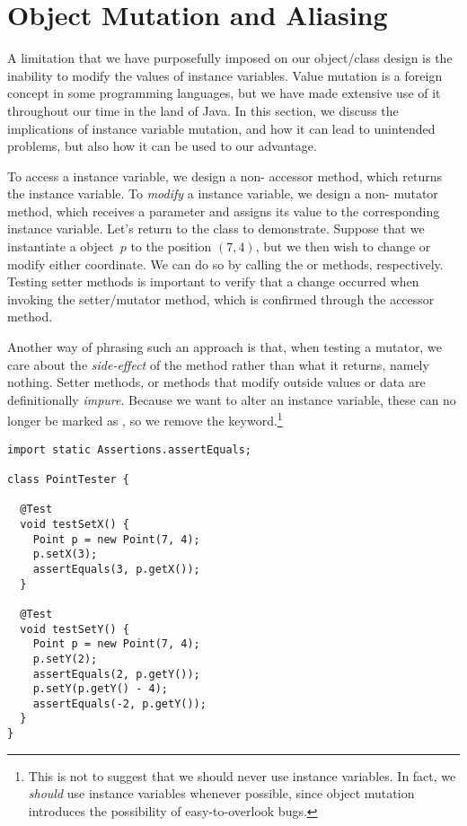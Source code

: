 \section{Object Mutation and Aliasing}
\label{chapter-classes-mutation-aliasing}

A limitation that we have purposefully imposed on our object/class design is the inability to modify the values of instance variables. 
Value mutation is a foreign concept in some programming languages, but we have made extensive use of it throughout our time in the land of Java. 
In this section, we discuss the implications of instance variable mutation, and how it can lead to unintended problems, but also how it can be used to our advantage.

To access a  instance variable, we design a non- accessor method, which returns the instance variable. 
To \emph{modify} a  instance variable, we design a non- mutator method, which receives a parameter and assigns its value to the corresponding instance variable. 
Let's return to the  class to demonstrate. 
Suppose that we instantiate a  object~$p$ to the position $(7, 4)$, but we then wish to change or modify either coordinate. 
We can do so by calling the  or  methods, respectively. 
Testing setter methods is important to verify that a change occurred when invoking the setter/mutator method, which is confirmed through the accessor method. 

Another way of phrasing such an approach is that, when testing a mutator, we care about the \emph{side-effect} of the method rather than what it returns, namely nothing. 
Setter methods, or methods that modify outside values or data are definitionally \emph{impure}. 
Because we want to alter an instance variable, these can no longer be marked as , so we remove the keyword.\footnote{This is not to suggest that we should never use  instance variables. In fact, we \emph{should} use  instance variables whenever possible, since object mutation introduces the possibility of easy-to-overlook bugs.}

\begin{lstlisting}[language=MyJava]
import static Assertions.assertEquals;

class PointTester {

  @Test
  void testSetX() {
    Point p = new Point(7, 4);
    p.setX(3);
    assertEquals(3, p.getX());
  }

  @Test
  void testSetY() {
    Point p = new Point(7, 4);
    p.setY(2);
    assertEquals(2, p.getY());
    p.setY(p.getY() - 4);
    assertEquals(-2, p.getY());
  }
}
\end{lstlisting}

